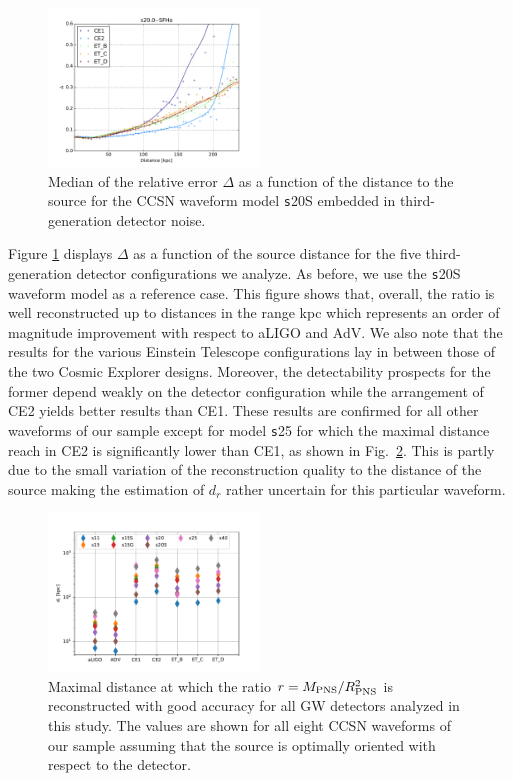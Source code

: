 \begin{figure}[t]
  \centering
  \includegraphics[width=0.5\textwidth]{plots/s20--SFHo_all3G}
  \caption{Median of the relative error $\Delta$ as a function of the  distance to the source for the CCSN waveform model {\texttt s20S} embedded in third-generation detector noise.}
  \label{fig:s20--SFHo_all3G}
\end{figure}

Figure \ref{fig:s20--SFHo_all3G} displays $\Delta$ as a function of the source distance for the five third-generation detector configurations we analyze. As before, we use the {\texttt s20S} waveform model as a reference case.  This figure shows that,  overall, the ratio is well reconstructed up to distances in the range \unit[100--200]{kpc} which represents an order of magnitude improvement with respect to aLIGO and AdV. We also note that the results for the various Einstein Telescope configurations lay in between those of the two Cosmic Explorer designs. Moreover,  the detectability prospects for the former depend weakly on the detector configuration while the arrangement of CE2 yields better results than CE1. These results are confirmed for all other waveforms of our sample except for model {\texttt s25} for which the maximal distance reach in CE2 is significantly lower than CE1, as shown in Fig.~\ref{fig:distances}. This is partly due to the small variation of the reconstruction quality to the distance of the source making the estimation of $d_r$ rather uncertain for this particular waveform. 

\begin{figure}[t]
  \centering
  \includegraphics[width=0.5\textwidth]{plots/dist_allwvfs_2G3G}
  \caption{Maximal distance at which the ratio $r=M_{\rm PNS}/R_{\rm PNS}^2$ is reconstructed
    with good accuracy for all GW detectors analyzed in this study. The values are shown for all eight CCSN waveforms of our sample assuming that the source is optimally oriented with respect to the detector. } 
\label{fig:distances}
\end{figure}

